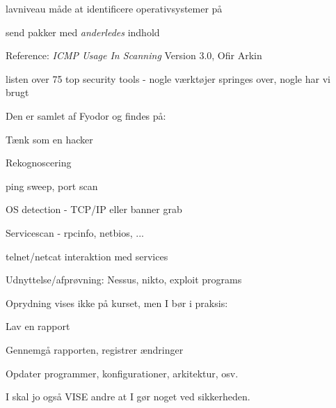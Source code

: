 \begin{list2}
  \item lavniveau måde at identificere operativsystemer på
\item send pakker med \emph{anderledes} indhold
\item Reference: \emph{ICMP Usage In Scanning} Version 3.0,
  Ofir Arkin\\ 
\end{list2}


\begin{list1}
\item listen over 75 top security
  tools - nogle værktøjer springes over, nogle har vi brugt
\item Den er samlet af Fyodor og findes på:\\
\end{list1}



\begin{list1}
\item Tænk som en hacker
\item Rekognoscering
\begin{list2}
\item ping sweep, port scan
\item OS detection - TCP/IP eller banner grab
\item Servicescan - rpcinfo, netbios, ...
\item telnet/netcat interaktion med services
\end{list2}
\item Udnyttelse/afprøvning: Nessus, nikto, exploit programs
\item Oprydning vises ikke på kurset, men I bør i praksis:
\begin{list2}
\item Lav en rapport
\item Gennemgå rapporten, registrer ændringer
\item Opdater programmer, konfigurationer, arkitektur, osv. 
\end{list2}
\item I skal jo også VISE andre at I gør noget ved sikkerheden.
\end{list1}





